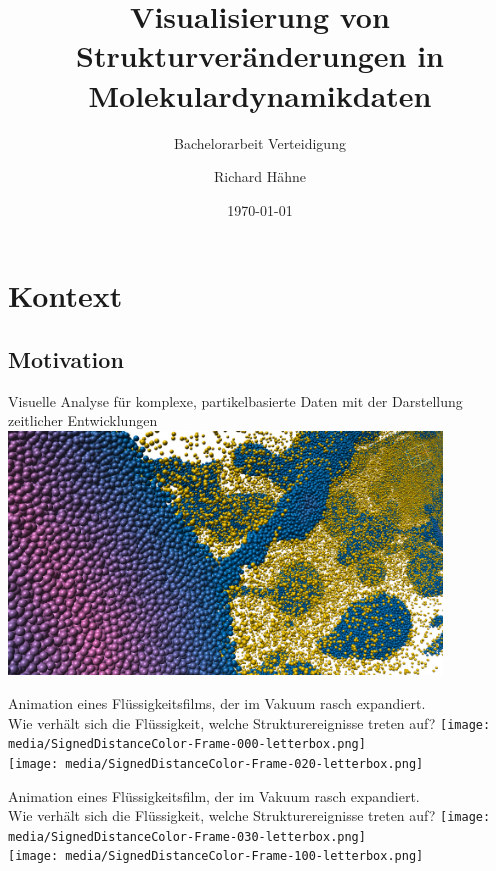 \documentclass[10pt]{beamer}
\title[Visualisierung von Strukturveränderungen in Molekulardynamikdaten]{Visualisierung von Strukturveränderungen in Molekulardynamikdaten}
\subtitle[Bachelorarbeit Verteidigung]{Bachelorarbeit Verteidigung}
\author[Richard Hähne]{Richard Hähne}
\institute{Institut für Software- und Multimediatechnik}
\date{\today}
\begin{document}
\maketitle
\frame{\tableofcontents[hideallsubsections]}

\section{Kontext}

\subsection{Motivation}
\begin{frame}
	Visuelle Analyse für komplexe, partikelbasierte Daten mit der Darstellung zeitlicher Entwicklungen
	\includegraphics*[width=11.5cm]{media/SignedDistanceColor-Show-Frame-60.png}
\end{frame}

\begin{frame}
	Animation eines Flüssigkeitsfilms, der im Vakuum rasch expandiert.\\
	Wie verhält sich die Flüssigkeit, welche Strukturereignisse treten auf?
	\texttt{[image: media/SignedDistanceColor-Frame-000-letterbox.png]}\\
	\texttt{[image: media/SignedDistanceColor-Frame-020-letterbox.png]}
\end{frame}

\begin{frame}
	Animation eines Flüssigkeitsfilm, der im Vakuum rasch expandiert.\\
	Wie verhält sich die Flüssigkeit, welche Strukturereignisse treten auf?
	\texttt{[image: media/SignedDistanceColor-Frame-030-letterbox.png]}\\
	\texttt{[image: media/SignedDistanceColor-Frame-100-letterbox.png]}
\end{frame}
\end{document}
